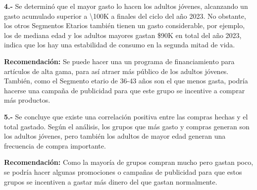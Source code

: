 \documentclass[oneside,11pt]{Latex/Classes/PhDthesisPSnPDF}
\begin{document}
\textbf{4.-} Se determinó que el mayor gasto lo hacen los adultos
jóvenes, alcanzando un gasto acumulado superior a \textbackslash100K a
finales del ciclo del año 2023. No obstante, los otros Segmentos Etarios
también tienen un gasto considerable, por ejemplo, los de mediana edad y
los adultos mayores gastan \$90K en total del año 2023, indica que los
hay una estabilidad de consumo en la segunda mitad de vida.

\textbf{Recomendación:} Se puede hacer una un programa de financiamiento
para artículos de alta gama, para así atraer más público de los adultos
jóvenes. También, como el Segmento etario de 36-43 años son el que menos
gasta, podría hacerse una campaña de publicidad para que este grupo se
incentive a comprar más productos.

\textbf{5.-} Se concluye que existe una correlación positiva entre las
compras hechas y el total gastado. Según el análisis, los grupos que más
gasto y compras generan son los adultos jóvenes, pero también los
adultos de mayor edad generan una frecuencia de compra importante.

\textbf{Recomendación:} Como la mayoría de grupos compran mucho pero
gastan poco, se podría hacer algunas promociones o campañas de
publicidad para que estos grupos se incentiven a gastar más dinero del
que gastan normalmente.

\renewcommand{\bibname}{Lista de Referencias}
 
 

\end{document}
